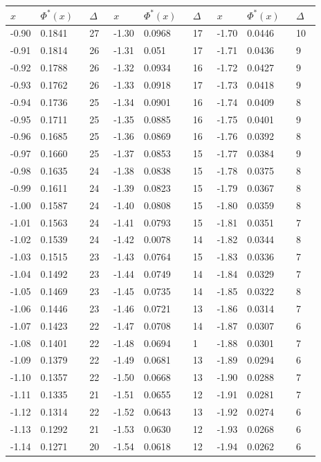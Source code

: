 \documentclass[russian, 12pt, fleqn]{article}
\begin{document}
\newpage
\noindent 
\begin{center}
\begin{tabular}[b]{ | l | l |  l || l | l | l || l | l |  l |  }
\hline
$x\ \ \ \ \ $&$\Phi^*(x)\ \ \ $&$\Delta\ \ \ $&$x\ \ \ \ \ $&$\Phi^*(x)\ \ \ $&$\Delta\ \ \ $&$x\ \ \ \ \ $&$\Phi^*(x)\ \ \ $&$\Delta\ \ \ $\\
\hline
-0.90&0.1841&27&-1.30&0.0968&17&-1.70&0.0446&10\\%
-0.91&0.1814&26&-1.31&0.051  &17&-1.71&0.0436&9 \\%
-0.92&0.1788&26&-1.32&0.0934&16&-1.72&0.0427&9 \\%
-0.93&0.1762&26&-1.33&0.0918&17&-1.73&0.0418&9 \\%
-0.94&0.1736&25&-1.34&0.0901&16&-1.74&0.0409&8 \\%
-0.95&0.1711&25&-1.35&0.0885&16&-1.75&0.0401&9 \\%

-0.96&0.1685&25&-1.36&0.0869&16&-1.76&0.0392&8 \\%
-0.97&0.1660&25&-1.37&0.0853&15&-1.77&0.0384&9 \\%
-0.98&0.1635&24&-1.38&0.0838&15&-1.78&0.0375&8 \\%
-0.99&0.1611&24&-1.39&0.0823&15&-1.79&0.0367&8 \\%

-1.00&0.1587&24&-1.40&0.0808&15&-1.80&0.0359&8\\%
-1.01&0.1563&24&-1.41&0.0793&15&-1.81&0.0351&7\\%
-1.02&0.1539&24&-1.42&0.0078&14&-1.82&0.0344&8\\%
-1.03&0.1515&23&-1.43&0.0764&15&-1.83&0.0336&7\\%
-1.04&0.1492&23&-1.44&0.0749&14&-1.84&0.0329&7\\%

-1.05&0.1469&23&-1.45&0.0735&14&-1.85&0.0322&8\\%
-1.06&0.1446&23&-1.46&0.0721&13&-1.86&0.0314&7\\%
-1.07&0.1423&22&-1.47&0.0708&14&-1.87&0.0307&6\\%
-1.08&0.1401&22&-1.48&0.0694&1&-1.88&0.0301&7\\%
-1.09&0.1379&22&-1.49&0.0681&13&-1.89&0.0294&6\\%

-1.10&0.1357&22&-1.50&0.0668&13&-1.90&0.0288&7\\%
-1.11&0.1335&21&-1.51&0.0655&12&-1.91&0.0281&7\\%
-1.12&0.1314&22&-1.52&0.0643&13&-1.92&0.0274&6\\%
-1.13&0.1292&21&-1.53&0.0630&12&-1.93&0.0268&6\\%
-1.14&0.1271&20&-1.54&0.0618&12&-1.94&0.0262&6\\%


\end{tabular}
\end{center}
\end{document}
